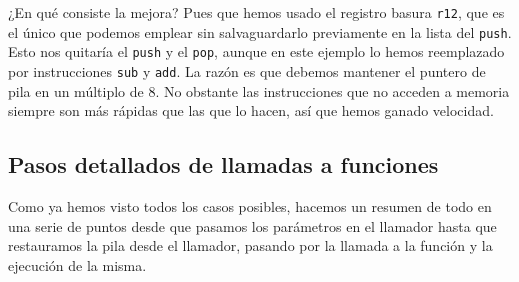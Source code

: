 ¿En qué consiste la mejora? Pues que hemos usado el registro basura {\tt r12}, que
es el único que podemos emplear sin salvaguardarlo previamente en la lista del {\tt push}.
Esto nos quitaría el {\tt push} y el {\tt pop}, aunque en este ejemplo lo hemos
reemplazado por instrucciones {\tt sub} y {\tt add}. La razón es que debemos mantener
el puntero de pila en un múltiplo de 8. No obstante las instrucciones que no acceden
a memoria siempre son más rápidas que las que lo hacen, así que hemos ganado velocidad.

\subsection{Pasos detallados de llamadas a funciones}

Como ya hemos visto todos los casos posibles, hacemos un resumen de todo en una
serie de puntos desde que pasamos los parámetros en el llamador hasta que restauramos
la pila desde el llamador, pasando por la llamada a la función y la ejecución de la misma.

